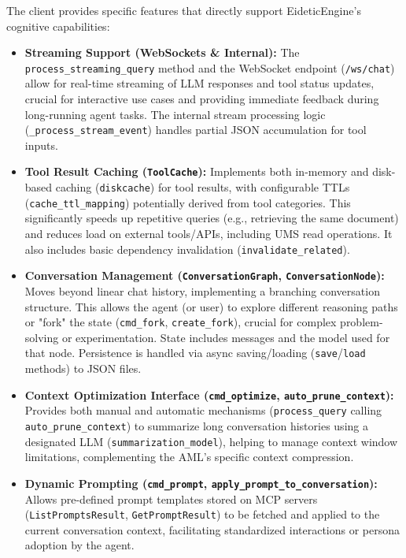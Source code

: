 \documentclass[12pt,a4paper]{article}
\newcommand{\code}[1]{\nolinkurl{#1}}
\begin{document}
The client provides specific features that directly support EideticEngine's cognitive capabilities:

\begin{itemize}
    \item \textbf{Streaming Support (WebSockets \& Internal):} The \code{process\_streaming\_query} method and the WebSocket endpoint (\code{/ws/chat}) allow for real-time streaming of LLM responses and tool status updates, crucial for interactive use cases and providing immediate feedback during long-running agent tasks. The internal stream processing logic (\code{\_process\_stream\_event}) handles partial JSON accumulation for tool inputs.

    \item \textbf{Tool Result Caching (\code{ToolCache}):} Implements both in-memory and disk-based caching (\code{diskcache}) for tool results, with configurable TTLs (\code{cache\_ttl\_mapping}) potentially derived from tool categories. This significantly speeds up repetitive queries (e.g., retrieving the same document) and reduces load on external tools/APIs, including UMS read operations. It also includes basic dependency invalidation (\code{invalidate\_related}).

    \item \textbf{Conversation Management (\code{ConversationGraph}, \code{ConversationNode}):} Moves beyond linear chat history, implementing a branching conversation structure. This allows the agent (or user) to explore different reasoning paths or "fork" the state (\code{cmd\_fork}, \code{create\_fork}), crucial for complex problem-solving or experimentation. State includes messages and the model used for that node. Persistence is handled via async saving/loading (\code{save}/\code{load} methods) to JSON files.

    \item \textbf{Context Optimization Interface (\code{cmd\_optimize}, \code{auto\_prune\_context}):} Provides both manual and automatic mechanisms (\code{process\_query} calling \code{auto\_prune\_context}) to summarize long conversation histories using a designated LLM (\code{summarization\_model}), helping to manage context window limitations, complementing the AML's specific context compression.

    \item \textbf{Dynamic Prompting (\code{cmd\_prompt}, \code{apply\_prompt\_to\_conversation}):} Allows pre-defined prompt templates stored on MCP servers (\code{ListPromptsResult}, \code{GetPromptResult}) to be fetched and applied to the current conversation context, facilitating standardized interactions or persona adoption by the agent.


\end{itemize}
\end{document}
